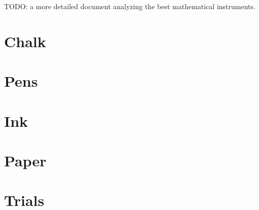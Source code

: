 \documentclass{article}
\author{Hagoromo Club}
\begin{document}
TODO: a more detailed document analyzing the best mathematical instruments.

\section{Chalk}

\section{Pens}

\section{Ink}

\section{Paper}

\section{Trials}
\end{document}
